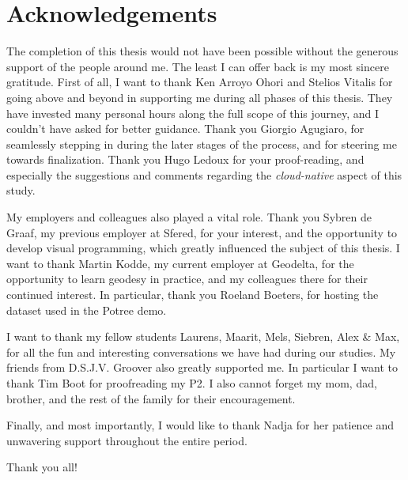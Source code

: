 
\chapter*{Acknowledgements}

The completion of this thesis would not have been possible without the generous support of the people around me. 
The least I can offer back is my most sincere gratitude.
First of all, I want to thank Ken Arroyo Ohori and Stelios Vitalis for going above and beyond in supporting me during all phases of this thesis.
They have invested many personal hours along the full scope of this journey, and I couldn't have asked for better guidance. 
Thank you Giorgio Agugiaro, for seamlessly stepping in during the later stages of the process, and for steering me towards finalization. 
Thank you Hugo Ledoux for your proof-reading, and especially the suggestions and comments regarding the \emph{cloud-native} aspect of this study.

My employers and colleagues also played a vital role. 
Thank you Sybren de Graaf, my previous employer at Sfered, for your interest, and the opportunity to develop visual programming, which greatly influenced the subject of this thesis.
I want to thank Martin Kodde, my current employer at Geodelta, for the opportunity to learn geodesy in practice, and my colleagues there for their continued interest. 
In particular, thank you Roeland Boeters, for hosting the dataset used in the Potree demo.

I want to thank my fellow students Laurens, Maarit, Mels, Siebren, Alex \& Max, for all the fun and interesting conversations we have had during our studies. 
My friends from D.S.J.V. Groover also greatly supported me. In particular I want to thank Tim Boot for proofreading my P2. I also cannot forget my mom, dad, brother, and the rest of the family for their encouragement. 

Finally, and most importantly, I would like to thank Nadja for her patience and unwavering support throughout the entire period.

Thank you all!

